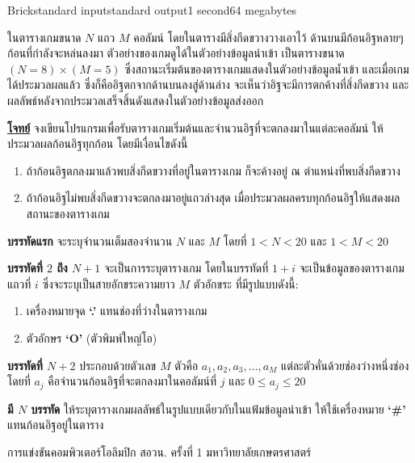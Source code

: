 \documentclass[11pt,a4paper]{article}
\begin{document}
\begin{problem}{Brick}{standard input}{standard output}{1 second}{64 megabytes}

ในตารางเกมขนาด $N$ แถว $M$ คอลัมน์ โดยในตารางมีสิ่งกีดขวางวางเอาไว้ ด้านบนมีก้อนอิฐหลายๆ ก้อนที่กำลังจะหล่นลงมา ตัวอย่างของเกมดูได้ในตัวอย่างข้อมูลนำเข้า เป็นตารางขนาด $(N=8)\times (M=5)$ ซึ่งสถานะเริ่มต้นของตารางเกมแสดงในตัวอย่างข้อมูลน้ำเข้า และเมื่อเกมได้ประมวลผลแล้ว ซึ่งก็คืออิฐตกจากด้านบนลงสู่ด้านล่าง จะเห็นว่าอิฐจะมีการตกค้างที่สิ่งกีดขวาง และผลลัพธ์หลังจากประมวลเสร็จสิ้นดังแสดงในตัวอย่างข้อมูลส่งออก


\underline{\textbf{โจทย์}} จงเขียนโปรแกรมเพื่อรับตารางเกมเริ่มต้นและจำนวนอิฐที่จะตกลงมาในแต่ละคอลัมน์ ให้ประมวลผลก้อนอิฐทุกก้อน โดยมีเงื่อนไขดังนี้
\begin{enumerate}
\item  ถ้าก้อนอิฐตกลงมาแล้วพบสิ่งกีดขวางที่อยู่ในตารางเกม ก็จะค้างอยู่ ณ ตำแหน่งที่พบสิ่งกีดขวาง
\item ถ้าก้อนอิฐไม่พบสิ่งกีดขวางจะตกลงมาอยู่แถวล่างสุด เมื่อประมวลผลครบทุกก้อนอิฐให้แสดงผลสถานะของตารางเกม 
\end{enumerate}

\InputFile
\textbf{บรรทัดแรก} จะระบุจำนวนเต็มสองจำนวน $N$ และ $M$ โดยที่ $1 < N < 20$ และ $1 < M < 20$

\textbf{บรรทัดที่ $2$ ถึง $N+1$} จะเป็นการระบุตารางเกม โดยในบรรทัดที่ $1 + i$ จะเป็นข้อมูลของตารางเกมแถวที่ $i$ ซึ่งจะระบุเป็นสายอักขระความยาว $M$ ตัวอักขระ ที่มีรูปแบบดังนี้:
\begin{enumerate}

\item เครื่องหมายจุด \textbf{‘.’} แทนช่องที่ว่างในตารางเกม 
\item ตัวอักษร \textbf{‘O’} (ตัวพิมพ์ใหญ่โอ) 
\end{enumerate}

\textbf{บรรทัดที่ $N+2$} ประกอบด้วยตัวเลข $M$ ตัวคือ $a_1,a_2,a_3,…,a_M$ แต่ละตัวคั่นด้วยช่องว่างหนึ่งช่อง โดยที่ $a_j$ คือจำนวนก้อนอิฐที่จะตกลงมาในคอลัมน์ที่ $j$ และ $0\leq a_j\leq20$

\OutputFile

\textbf{มี $N$ บรรทัด} ให้ระบุตารางเกมผลลัพธ์ในรูปแบบเดียวกับในแฟ้มข้อมูลนำเข้า ให้ใช้เครื่องหมาย \textbf{‘\#’} แทนก้อนอิฐอยู่ในตาราง

\Examples

\begin{example}
%
\end{example}

\Source

การแข่งขันคอมพิวเตอร์โอลิมปิก สอวน. ครั้งที่ 1 มหาวิทยาลัยเกษตรศาสตร์

\end{problem}
\end{document}
